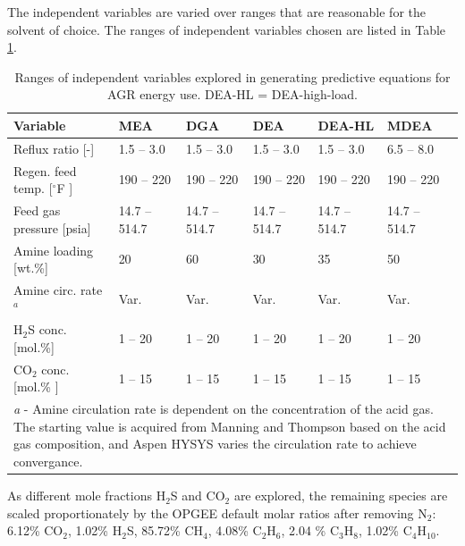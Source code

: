 \documentclass[11pt]{report}
\begin{document}
The independent variables are varied over ranges that are reasonable for the solvent of choice.  The ranges of independent variables chosen are listed in Table \ref{tab:AGR_Aspen_Variable_Ranges}.

\begin{table}
\begin{scriptsize}
\caption{Ranges of independent variables explored in generating predictive equations for AGR energy use. DEA-HL = DEA-high-load.}
\label{tab:AGR_Aspen_Variable_Ranges}
\begin{tabular*}{1\columnwidth}{p{}p{}p{}p{}p{}p{}}
\toprule
Variable & MEA & DGA & DEA & DEA-HL & MDEA\\
\midrule
Reflux ratio [-]				&	1.5 -- 3.0				&	1.5 -- 3.0				& 	1.5 -- 3.0				&	1.5 -- 3.0 			& 6.5 -- 8.0  		 \\
Regen. feed temp. [$^\circ$F ] 	&	190 -- 220 	 		&	190 -- 220 	 		&	190 -- 220 	 		& 190 -- 220 		 	& 190 -- 220 	 	\\
Feed gas pressure  [psia]		&	14.7 -- 514.7 	 		&	14.7 -- 514.7 	 		&	14.7 -- 514.7 	  		& 14.7 -- 514.7 	  		& 14.7 -- 514.7 	 	 \\
Amine loading 	[wt.\%]		&	20 					&	60 	 				&	30 					& 35 	 				& 50 				 \\
Amine circ. rate$^a$ 			&	Var. 					&	Var. 				 	&	Var. 			 		& Var. 				& Var. 			 \\
H$_2$S conc. [mol.\%]		&	1 -- 20 				&	1 -- 20 	 			&	1 -- 20 				& 1 -- 20 				& 1 -- 20 			 \\
CO$_2$ conc. [mol.\% ] 		&	1 -- 15 	 			&	1 -- 15 	 			&	1 -- 15 	  			& 1 -- 15 	 			& 1 -- 15 	 		 \\
\bottomrule
\multicolumn{6}{p{0.9\columnwidth}}{\emph{a} - Amine circulation rate is dependent on the concentration of the acid gas. The starting value is acquired from Manning and Thompson \cite{Manning1991} based on the acid gas composition, and Aspen HYSYS varies the circulation rate to achieve convergance.}\\
\end{tabular*}
\end{scriptsize}
\end{table}


As different mole fractions H$_2$S and CO$_2$ are explored, the remaining species are scaled proportionately by the OPGEE default molar ratios after removing N$_2$: 6.12\% CO$_2$, 1.02\% H$_2$S, 85.72\% CH$_4$, 4.08\% C$_2$H$_6$, 2.04 \% C$_3$H$_8$, 1.02\% C$_4$H$_10$.  
\end{document}
